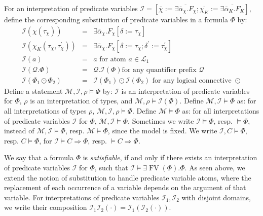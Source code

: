 \documentclass{article}
\newcommand{\assign}{:=}
\newcommand{\cdummy}{\cdot}
\newcommand{\tmem}[1]{{\em #1\/}}
\newcommand{\tmop}[1]{\ensuremath{\operatorname{#1}}}
\begin{document}
For an interpretation of predicate variables $\mathcal{I}= [\bar{\chi} \assign
\overline{\exists \bar{\alpha}_{\chi} .F_{\chi}} ; \overline{\chi_K} \assign
\overline{\exists \bar{\alpha}_K .F_K}]$, define the corresponding
substitution of predicate variables in a formula $\Phi$ by:
\begin{eqnarray*}
  \mathcal{I} (\chi (\tau_{\chi})) & = & \exists \bar{\alpha}_{\chi} .F_{\chi}
  [\delta \assign \tau_{\chi}]\\
  \mathcal{I} (\chi_K (\tau_{\chi}, \tau_{\chi}^{\prime})) & = & \exists
  \bar{\alpha}_{\chi} .F_{\chi} [\delta \assign \tau_{\chi} ; \delta^{\prime}
  \assign \tau_{\chi}^{\prime}]\\
  \mathcal{I} (a) & = & a \text{ \ for atom } a \in \mathcal{L}_1\\
  \mathcal{I} (\mathcal{Q}. \Phi) & = & \mathcal{Q}.\mathcal{I} (\Phi) \text{
  \ for any quantifier prefix } \mathcal{Q}\\
  \mathcal{I} (\Phi_1 \odot \Phi_2) & = & \mathcal{I} (\Phi_1) \odot
  \mathcal{I} (\Phi_2) \text{ \ for any logical connective } \odot
\end{eqnarray*}
Define a statement $\mathcal{M}, \mathcal{I}, \rho \vDash \Phi$ by:
$\mathcal{I}$ is an interpretation of predicate variables for $\Phi$, $\rho$
is an interpretation of types, and $\mathcal{M}, \rho \vDash \mathcal{I}
(\Phi)$. Define $\mathcal{M}, \mathcal{I} \vDash \Phi$ as: for all
interpretations of types $\rho$, $\mathcal{M}, \mathcal{I}, \rho \vDash \Phi$.
Define $\mathcal{M} \vDash \Phi$ as: for all interpretations of predicate
variables $\mathcal{I}$ for $\Phi$, $\mathcal{M}, \mathcal{I} \vDash \Phi$.
Sometimes we write $\mathcal{I} \vDash \Phi$, resp. $\vDash \Phi$, instead of
$\mathcal{M}, \mathcal{I} \vDash \Phi$, resp. $\mathcal{M} \vDash \Phi$, since
the model is fixed. We write $\mathcal{I}, C \vDash \Phi$, resp. $C \vDash
\Phi$, for $\mathcal{I} \vDash C \Rightarrow \Phi$, resp. $\vDash C
\Rightarrow \Phi$.

We say that a formula $\Phi$ is {\tmem{satisfiable}}, if and only if there
exists an interpretation of predicate variables $\mathcal{I}$ for $\Phi$, such
that $\mathcal{I} \vDash \exists \tmop{FV} (\Phi) . \Phi$. As seen above, we
extend the notion of substitution to handle predicate variable atoms, where
the replacement of each occurrence of a variable depends on the argument of
that variable. For interpretations of predicate variables $\mathcal{I}_1,
\mathcal{I}_2$ with disjoint domains, we write their composition
$\mathcal{I}_1 \mathcal{I}_2 (\cdummy) =\mathcal{I}_1 (\mathcal{I}_2
(\cdummy))$.
\end{document}
